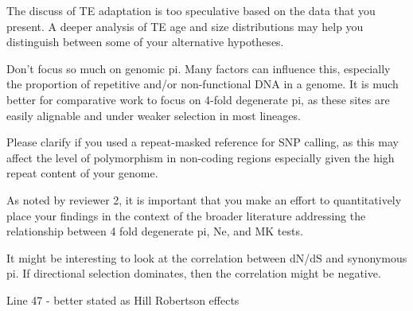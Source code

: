 \begin{point}{} %
The discuss of TE adaptation is too speculative based on the data that
you present. A deeper analysis of TE age and size distributions may help
you distinguish between some of your alternative hypotheses.
\end{point}


\begin{point}{} %
Don't focus so much on genomic pi. Many factors can influence this,
especially the proportion of repetitive and/or non-functional DNA in a
genome. It is much better for comparative work to focus on 4-fold
degenerate pi, as these sites are easily alignable and under weaker
selection in most lineages.
\end{point}


\begin{point}{} %
Please clarify if you used a repeat-masked reference for SNP calling, as
this may affect the level of polymorphism in non-coding regions
especially given the high repeat content of your genome.
\end{point}


\begin{point}{} %
As noted by reviewer 2, it is important that you make an effort to
quantitatively place your findings in the context of the broader
literature addressing the relationship between 4 fold degenerate pi, Ne,
and MK tests.
\end{point}


\begin{point}{} %
It might be interesting to look at the correlation between dN/dS and
synonymous pi. If directional selection dominates, then the correlation
might be negative.
\end{point}


\begin{point}{} %
Line 47 - better stated as Hill Robertson effects
\end{point}

